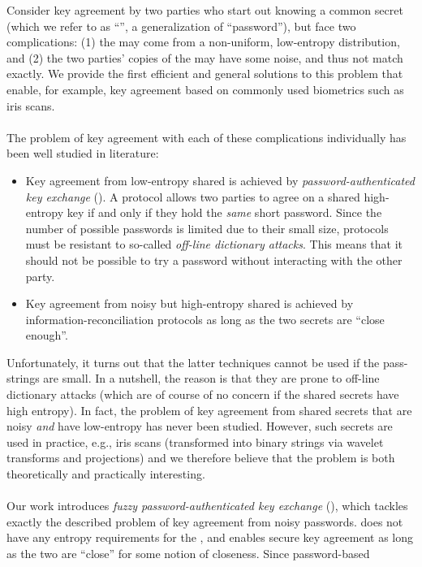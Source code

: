 \documentclass[envcountsame,runningheads]{llncs}
\begin{document}
Consider key agreement by two parties who start out knowing a common secret (which we refer to as ``\password'', a generalization of ``password''),
but face two complications: 
(1) the \password may come from a non-uniform, low-entropy distribution, and 
(2) the two parties' copies of the \password may have some noise, and thus not match exactly.
We provide the first efficient and general solutions to this problem that enable, for example, key agreement based on commonly used biometrics such as iris scans.\\
\\
The problem of key agreement with each of these complications individually has been well studied in literature:
\begin{itemize}
 \item Key agreement from low-entropy shared \passwords is achieved by \emph{password-authenticated key exchange} (\PAKE). A \PAKE protocol 
allows two parties to agree on a shared high-entropy key if and only if they hold the \emph{same} short password. Since the number of possible passwords is limited due
to their small size, \PAKE protocols must be resistant to so-called \emph{off-line dictionary attacks}. This means that it should not be possible to try a password
without interacting with the other party.
 \item Key agreement from noisy but high-entropy shared \passwords is achieved by information-reconciliation protocols as long as the two secrets are ``close enough''.
\end{itemize}
Unfortunately, it turns out that the latter techniques cannot be used if the pass-strings are small. In a nutshell, the reason is that they are prone to off-line 
dictionary attacks (which are of course of no concern
if the shared secrets have high entropy). In fact, the problem of key agreement from shared secrets that are noisy \emph{and} have low-entropy has never been studied. 
However, such secrets are used in practice, e.g., iris scans (transformed into binary strings via wavelet transforms and projections) and we therefore believe that
the problem is both theoretically and practically interesting.\\
\\
Our work introduces \emph{fuzzy password-authenticated key exchange} (\FAKE), which tackles exactly the described problem of key agreement from noisy passwords.
\FAKE does not have any entropy requirements for the \passwords, and enables secure key agreement as long as the two \passwords are ``close'' for some notion of closeness. Since password-based
\end{document}

